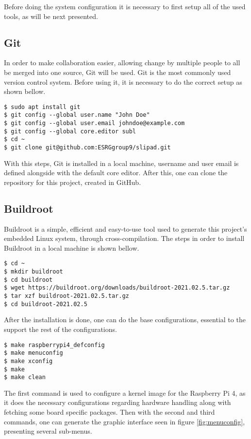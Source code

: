 Before doing the system configuration it is necessary to first setup all of the used tools, as will be next presented.

\subsection{Git}
In order to make collaboration easier, allowing change by multiple people to all be merged into one source, Git will be used. Git is the most commonly used version control system. Before using it, it is necessary to do the correct setup as shown bellow.
\begin{lstlisting}
$ sudo apt install git
$ git config --global user.name "John Doe"
$ git config --global user.email johndoe@example.com
$ git config --global core.editor subl
$ cd ~
$ git clone git@github.com:ESRGgroup9/slipad.git
\end{lstlisting}

With this steps, Git is installed in a local machine, username and user email is defined alongside with the default core editor. After this, one can clone the repository for this project, created in GitHub.

\subsection{Buildroot}
Buildroot is a simple, efficient and easy-to-use tool used to generate this project's embedded Linux system, through cross-compilation. The steps in order to install Buildroot in a local machine is shown bellow.

\begin{lstlisting}
$ cd ~
$ mkdir buildroot
$ cd buildroot
$ wget https://buildroot.org/downloads/buildroot-2021.02.5.tar.gz
$ tar xzf buildroot-2021.02.5.tar.gz
$ cd buildroot-2021.02.5
\end{lstlisting}

After the installation is done, one can do the base configurations, essential to the support the rest of the configurations.
\begin{lstlisting}
$ make raspberrypi4_defconfig
$ make menuconfig
$ make xconfig
$ make 
$ make clean
\end{lstlisting}

The first command is used to configure a kernel image for the Raspberry Pi 4, as it does the necessary configurations regarding hardware handling along with fetching some board specific packages. Then with the second and third commands, one can generate the graphic interface seen in figure \ref{fig:menuconfig}, presenting several sub-menus. 

